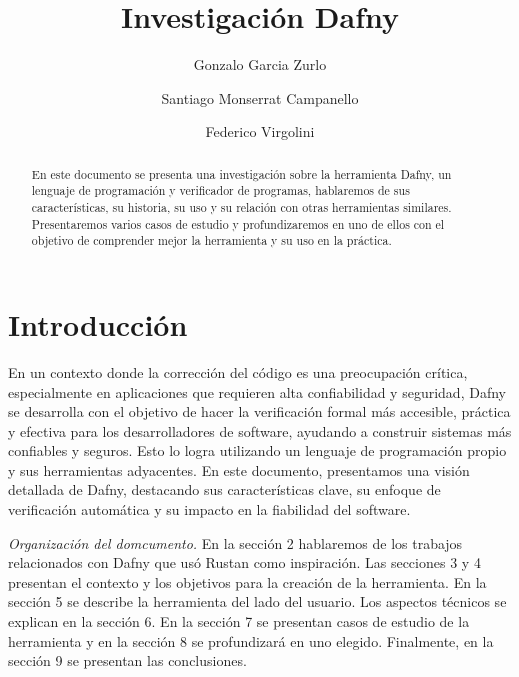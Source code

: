 \documentclass[runningheads]{llncs}
\begin{document}
%
\title{Investigación Dafny}
%
\author{Gonzalo Garcia Zurlo \and
Santiago Monserrat Campanello \and
Federico Virgolini}
%
%
%
\maketitle
\begin{abstract}
En este documento se presenta una investigación sobre la herramienta Dafny, un lenguaje de programación y verificador de programas,
hablaremos de sus características, su historia, su uso y su relación con otras herramientas similares. 
Presentaremos varios casos de estudio y profundizaremos en uno de ellos con el objetivo de comprender mejor la herramienta y su uso en la práctica.
\end{abstract}

\section{Introducción}

En un contexto donde la corrección del código es una preocupación crítica, especialmente en aplicaciones que requieren alta confiabilidad y seguridad,
Dafny se desarrolla con el objetivo de hacer la verificación formal más accesible, práctica y efectiva para los desarrolladores de software, 
ayudando a construir sistemas más confiables y seguros.
Esto lo logra utilizando un lenguaje de programación propio y sus herramientas adyacentes.
En este documento, presentamos una visión detallada de Dafny, 
destacando sus características clave, su enfoque de verificación automática y su impacto en la fiabilidad del software.

\emph{Organización del domcumento.} En la sección 2 hablaremos de los trabajos relacionados con Dafny que usó Rustan como inspiración.
Las secciones 3 y 4 presentan el contexto y los objetivos para la creación de la herramienta.
En la sección 5 se describe la herramienta del lado del usuario. Los aspectos técnicos se explican en la sección 6.
En la sección 7 se presentan casos de estudio de la herramienta y en la sección 8 se profundizará en uno elegido. 
Finalmente, en la sección 9 se presentan las conclusiones.
\end{document}
